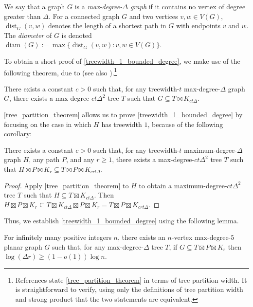 \documentclass{patmorin}
\newcommand{\defin}[1]{\emph{\color{brightmaroon}#1}}
\DeclareMathOperator{\dist}{dist}
\DeclareMathOperator{\diam}{diam}
\begin{document}
We say that a graph $G$ is a \defin{max-degree-$\Delta$ graph} if it contains no vertex of degree greater than $\Delta$.  For a connected graph $G$ and two vertices $v,w\in V(G)$, $\dist_G(v,w)$ denotes the length of a shortest path in $G$ with endpoints $v$ and $w$.  The \defin{diameter} of $G$ is denoted $\diam(G):=\max\{\dist_G(v,w):v,w\in V(G)\}$.

To obtain a short proof of \cref{treewidth_1_bounded_degree}, we make use of the following theorem, due to \citet{ding.oporowski:some} (see also \citet{wood:on}).\footnote{References \cite{ding.oporowski:some,wood:on} state \cref{tree_partition_theorem} in terms of tree partition width. It is straightforward to verify, using only the definitions of tree partition width and strong product that the two statements are equivalent.}

\begin{thm}\label{tree_partition_theorem}
  There exists a constant $c>0$ such that, for any treewidth-$t$ max-degree-$\Delta$ graph $G$, there exists a max-degree-$ct\Delta^2$ tree $T$ such that $G\subseteq T\boxtimes K_{ct\Delta}$.
\end{thm}

\cref{tree_partition_theorem} allows us to prove \cref{treewidth_1_bounded_degree} by focusing on the case in which $H$ has treewidth $1$, because of the following corollary:

\begin{cor}\label{tree_partition_corollary}
  There exists a constant $c>0$ such that, for any treewidth-$t$ maximum-degree-$\Delta$ graph $H$, any path $P$, and any $r\ge 1$, there exists a max-degree-$ct\Delta^2$ tree $T$ such that $H\boxtimes P\boxtimes K_r \subseteq T\boxtimes P\boxtimes K_{crt\Delta}$.
\end{cor}

\begin{proof}
  Apply \cref{tree_partition_theorem} to $H$ to obtain a maximum-degree-$ct\Delta^2$ tree $T$ such that $H\subseteq T\boxtimes K_{ct\Delta}$.  Then $H\boxtimes P\boxtimes K_{r} \subseteq T\boxtimes K_{ct\Delta}\boxtimes P\boxtimes K_r=T\boxtimes P\boxtimes K_{crt\Delta}$.
\end{proof}

Thus, we establish \cref{treewidth_1_bounded_degree} using the following lemma.

\begin{lem}\label{easy_version}
  For infinitely many positive integers $n$, there exists an $n$-vertex max-degree-$5$ planar graph $G$ such that, for any max-degree-$\Delta$ tree $T$, if $G\subseteq T\boxtimes P\boxtimes K_r$ then $\log (\Delta r)\ge (1-o(1))\log n$.
\end{lem}
\end{document}
